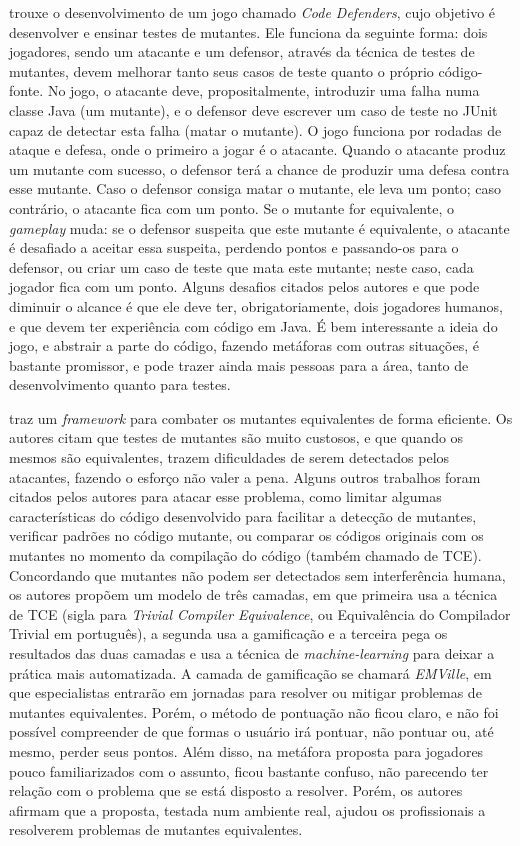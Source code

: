 \documentclass[twoside,english,brazilian]{UNISINOSartigo}
\begin{document}
\cite{Rojas} trouxe o desenvolvimento de um jogo chamado \textit{Code Defenders}, cujo objetivo é desenvolver e ensinar testes de mutantes. Ele funciona da seguinte forma: dois jogadores, sendo um atacante e um defensor, através da técnica de testes de mutantes, devem melhorar tanto seus casos de teste quanto o próprio código-fonte. No jogo, o atacante deve, propositalmente, introduzir uma falha numa classe Java (um mutante), e o defensor deve escrever um caso de teste no JUnit capaz de detectar esta falha (matar o mutante). O jogo funciona por rodadas de ataque e defesa, onde o primeiro a jogar é o atacante. Quando o atacante produz um mutante com sucesso, o defensor terá a chance de produzir uma defesa contra esse mutante. Caso o defensor consiga matar o mutante, ele leva um ponto; caso contrário, o atacante fica com um ponto. Se o mutante for equivalente, o \textit{gameplay} muda: se o defensor suspeita que este mutante é equivalente, o atacante é desafiado a aceitar essa suspeita, perdendo pontos e passando-os para o defensor, ou criar um caso de teste que mata este mutante; neste caso, cada jogador fica com um ponto. Alguns desafios citados pelos autores e que pode diminuir o alcance é que ele deve ter, obrigatoriamente, dois jogadores humanos, e que devem ter experiência com código em Java. É bem interessante a ideia do jogo, e abstrair a parte do código, fazendo metáforas com outras situações, é bastante promissor, e pode trazer ainda mais pessoas para a área, tanto de desenvolvimento quanto para testes.

\cite{Houshmand} traz um \textit{framework} para combater os mutantes equivalentes de forma eficiente. Os autores citam que testes de mutantes são muito custosos, e que quando os mesmos são equivalentes, trazem dificuldades de serem detectados pelos atacantes, fazendo o esforço não valer a pena. Alguns outros trabalhos foram citados pelos autores para atacar esse problema, como limitar algumas características do código desenvolvido para facilitar a detecção de mutantes, verificar padrões no código mutante, ou comparar os códigos originais com os mutantes no momento da compilação do código (também chamado de TCE). Concordando que mutantes não podem ser detectados sem interferência humana, os autores propõem um modelo de três camadas, em que primeira usa a técnica de TCE (sigla para \textit{Trivial Compiler Equivalence}, ou Equivalência do Compilador Trivial em português), a segunda usa a gamificação e a terceira pega os resultados das duas camadas e usa a técnica de \textit{machine-learning} para deixar a prática mais automatizada. A camada de gamificação se chamará \textit{EMVille}, em que especialistas entrarão em jornadas para resolver ou mitigar problemas de mutantes equivalentes. Porém, o método de pontuação não ficou claro, e não foi possível compreender de que formas o usuário irá pontuar, não pontuar ou, até mesmo, perder seus pontos. Além disso, na metáfora proposta para jogadores pouco familiarizados com o assunto, ficou bastante confuso, não parecendo ter relação com o problema que se está disposto a resolver. Porém, os autores afirmam que a proposta, testada num ambiente real, ajudou os profissionais a resolverem problemas de mutantes equivalentes.
\end{document}
